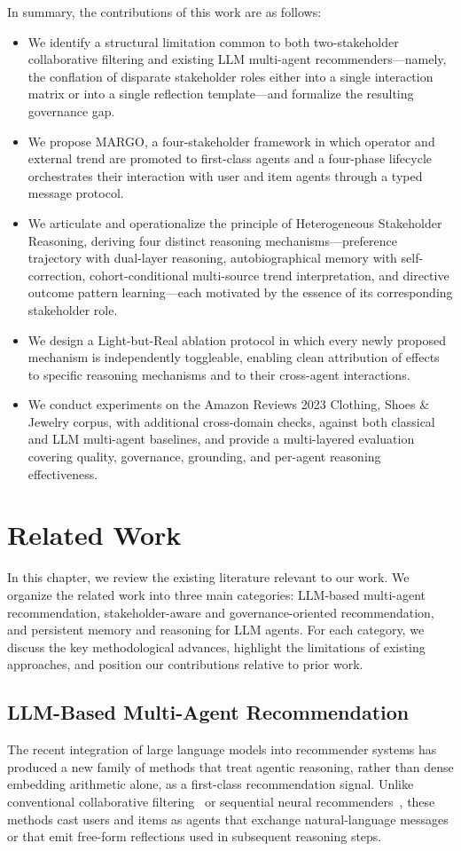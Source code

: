 \documentclass[master,english,final]{postech-ucs}
\begin{document}
In summary, the contributions of this work are as follows:
\begin{itemize}
    \item We identify a structural limitation common to both two-stakeholder collaborative filtering and existing LLM multi-agent recommenders---namely, the conflation of disparate stakeholder roles either into a single interaction matrix or into a single reflection template---and formalize the resulting governance gap.
    \item We propose MARGO, a four-stakeholder framework in which operator and external trend are promoted to first-class agents and a four-phase lifecycle orchestrates their interaction with user and item agents through a typed message protocol.
    \item We articulate and operationalize the principle of Heterogeneous Stakeholder Reasoning, deriving four distinct reasoning mechanisms---preference trajectory with dual-layer reasoning, autobiographical memory with self-correction, cohort-conditional multi-source trend interpretation, and directive outcome pattern learning---each motivated by the essence of its corresponding stakeholder role.
    \item We design a Light-but-Real ablation protocol in which every newly proposed mechanism is independently toggleable, enabling clean attribution of effects to specific reasoning mechanisms and to their cross-agent interactions.
    \item We conduct experiments on the Amazon Reviews 2023 Clothing, Shoes \& Jewelry corpus, with additional cross-domain checks, against both classical and LLM multi-agent baselines, and provide a multi-layered evaluation covering quality, governance, grounding, and per-agent reasoning effectiveness.
\end{itemize}

\chapter{Related Work}
In this chapter, we review the existing literature relevant to our work.
We organize the related work into three main categories: LLM-based multi-agent recommendation, stakeholder-aware and governance-oriented recommendation, and persistent memory and reasoning for LLM agents.
For each category, we discuss the key methodological advances, highlight the limitations of existing approaches, and position our contributions relative to prior work.

\section{LLM-Based Multi-Agent Recommendation}
The recent integration of large language models into recommender systems has produced a new family of methods that treat agentic reasoning, rather than dense embedding arithmetic alone, as a first-class recommendation signal.
Unlike conventional collaborative filtering~\cite{he2020lightgcn} or sequential neural recommenders~\cite{kang2018self}, these methods cast users and items as agents that exchange natural-language messages or that emit free-form reflections used in subsequent reasoning steps.
\end{document}
